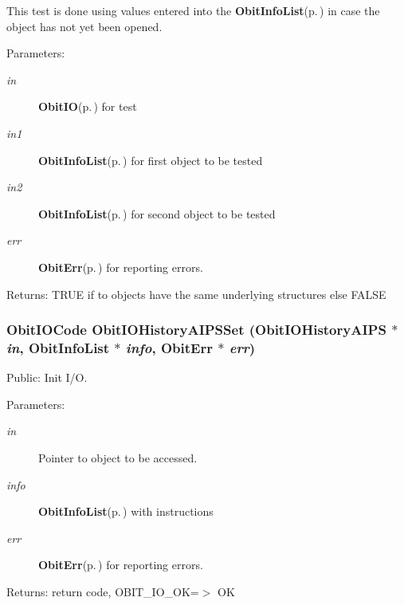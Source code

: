 This test is done using values entered into the {\bf Obit\-Info\-List}{\rm (p.\,\pageref{structObitInfoList})} in case the object has not yet been opened. \begin{Desc}
\item[Parameters:]
\begin{description}
\item[{\em in}]{\bf Obit\-IO}{\rm (p.\,\pageref{structObitIO})} for test \item[{\em in1}]{\bf Obit\-Info\-List}{\rm (p.\,\pageref{structObitInfoList})} for first object to be tested \item[{\em in2}]{\bf Obit\-Info\-List}{\rm (p.\,\pageref{structObitInfoList})} for second object to be tested \item[{\em err}]{\bf Obit\-Err}{\rm (p.\,\pageref{structObitErr})} for reporting errors. \end{description}
\end{Desc}
\begin{Desc}
\item[Returns:]TRUE if to objects have the same underlying structures else FALSE \end{Desc}
\subsubsection{\setlength{\rightskip}{0pt plus 5cm}Obit\-IOCode Obit\-IOHistory\-AIPSSet ({\bf Obit\-IOHistory\-AIPS} $\ast$ {\em in}, {\bf Obit\-Info\-List} $\ast$ {\em info}, {\bf Obit\-Err} $\ast$ {\em err})}\label{ObitIOHistoryAIPS_8c_a17}


Public: Init I/O. 

\begin{Desc}
\item[Parameters:]
\begin{description}
\item[{\em in}]Pointer to object to be accessed. \item[{\em info}]{\bf Obit\-Info\-List}{\rm (p.\,\pageref{structObitInfoList})} with instructions \item[{\em err}]{\bf Obit\-Err}{\rm (p.\,\pageref{structObitErr})} for reporting errors. \end{description}
\end{Desc}
\begin{Desc}
\item[Returns:]return code, OBIT\_\-IO\_\-OK=$>$ OK \end{Desc}
